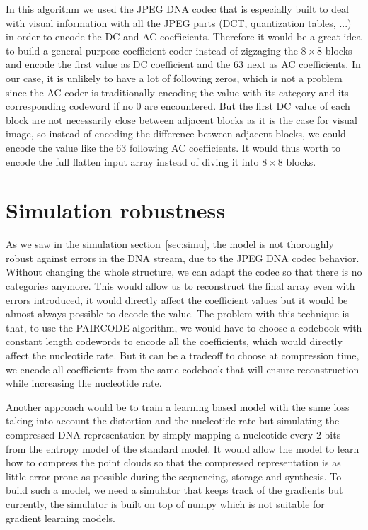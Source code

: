 In this algorithm we used the JPEG DNA codec that is especially built to deal with visual information with all the JPEG parts (DCT, quantization tables, ...) in order to encode the DC and AC coefficients. 
Therefore it would be a great idea to build a general purpose coefficient coder instead of zigzaging the $8 \times 8$ blocks and encode the first value as DC coefficient and the $63$ next as AC coefficients. In our case, it is unlikely to have a lot of following zeros, which is not a problem since the AC coder is traditionally encoding the value with its category and its corresponding codeword if no $0$ are encountered.
But the first DC value of each block are not necessarily close between adjacent blocks as it is the case for visual image, so instead of encoding the difference between adjacent blocks, we could encode the value like the $63$ following AC coefficients.
It would thus worth to encode the full flatten input array instead of diving it into $8 \times 8$ blocks. 


\section{Simulation robustness}

As we saw in the simulation section~\ref{sec:simu}, the model is not thoroughly robust against errors in the DNA stream, due to the JPEG DNA codec behavior. Without changing the whole structure, we can adapt the codec so that there is no categories anymore. This would allow us to reconstruct the final array even with errors introduced, it would directly affect the coefficient values but it would be almost always possible to decode the value. The problem with this technique is that, to use the PAIRCODE algorithm, we would have to choose a codebook with constant length codewords to encode all the coefficients, which would directly affect the nucleotide rate. But it can be a tradeoff to choose at compression time, we encode all coefficients from the same codebook that will ensure reconstruction while increasing the nucleotide rate.

Another approach would be to train a learning based model with the same loss taking into account the distortion and the nucleotide rate but simulating the compressed DNA representation by simply mapping a nucleotide every $2$ bits from the entropy model of the standard model. It would allow the model to learn how to compress the point clouds so that the compressed representation is as little error-prone as possible during the sequencing, storage and synthesis.
To build such a model, we need a simulator that keeps track of the gradients but currently, the simulator is built on top of numpy which is not suitable for gradient learning models. 
